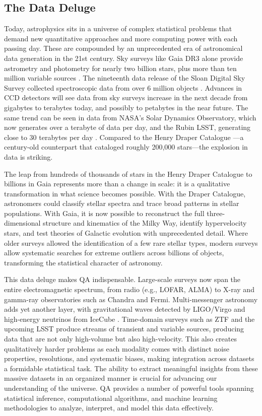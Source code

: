 \documentclass[preprint,longauthor]{aastex631}
\numberwithin{equation}{section}
\begin{document}
\subsection{The Data Deluge}

Today, astrophysics sits in a universe of complex statistical problems that demand new quantitative approaches and more computing power with each passing day. These are compounded by an unprecedented era of astronomical data generation in the 21st century. Sky surveys like Gaia DR3 alone provide astrometry and photometry for nearly two billion stars, plus more than ten million variable sources \citep{gaiacollaborationGaiaDataRelease2023}. The nineteenth data release of the Sloan Digital Sky Survey collected spectroscopic data from over 6 million objects \citep{sdsscollaborationNineteenthDataRelease2025}. Advances in CCD detectors will see data from sky surveys increase in the next decade from gigabytes to terabytes today, and possibly to petabytes in the near future. The same trend can be seen in data from NASA's Solar Dynamics Observatory, which now generates over a terabyte of data per day, and the Rubin LSST, generating close to 30 terabytes per day \citep{borneAstroinformatics21stCentury2009}. Compared to the Henry Draper Catalogue \citep{cannonHenryDraperCatalogue1918}—a century-old counterpart that cataloged roughly 200,000 stars—the explosion in data is striking.

The leap from hundreds of thousands of stars in the Henry Draper Catalogue to billions in Gaia represents more than a change in scale: it is a qualitative transformation in what science becomes possible. With the Draper Catalogue, astronomers could classify stellar spectra and trace broad patterns in stellar populations. With Gaia, it is now possible to reconstruct the full three-dimensional structure and kinematics of the Milky Way, identify hypervelocity stars, and test theories of Galactic evolution with unprecedented detail. Where older surveys allowed the identification of a few rare stellar types, modern surveys allow systematic searches for extreme outliers across billions of objects, transforming the statistical character of astronomy.

This data deluge makes QA indispensable. Large-scale surveys now span the entire electromagnetic spectrum, from radio (e.g., LOFAR, ALMA) to X-ray and gamma-ray observatories such as Chandra and Fermi. Multi-messenger astronomy adds yet another layer, with gravitational waves detected by LIGO/Virgo and high-energy neutrinos from IceCube \citep{abbasiSearchIceCubeSubTeV2023}. Time-domain surveys such as ZTF and the upcoming LSST produce streams of transient and variable sources, producing data that are not only high-volume but also high-velocity. This also creates qualitatively harder problems as each modality comes with distinct noise properties, resolutions, and systematic biases, making integration across datasets a formidable statistical task. The ability to extract meaningful insights from these massive datasets in an organized manner is crucial for advancing our understanding of the universe. QA provides a number of powerful tools spanning statistical inference, computational algorithms, and machine learning methodologies to analyze, interpret, and model this data effectively.
\end{document}
